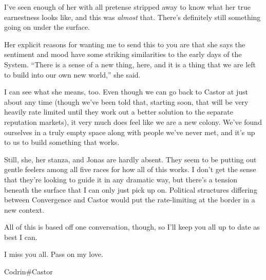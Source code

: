 I've seen enough of her with all pretense stripped away to know what her true earnestness looks like, and this was \emph{almost} that. There's definitely still something going on under the surface.

Her explicit reasons for wanting me to send this to you are that she says the sentiment and mood have some striking similarities to the early days of the System. ``There is a sense of a new thing, here, and it is a thing that we are left to build into our own new world,'' she said.

I can see what she means, too. Even though we can go back to Castor at just about any time (though we've been told that, starting soon, that will be very heavily rate limited until they work out a better solution to the separate reputation markets), it very much does feel like we are a new colony. We've found ourselves in a truly empty space along with people we've never met, and it's up to us to build something that works.

Still, she, her stanza, and Jonas are hardly absent. They seem to be putting out gentle feelers among all five races for how all of this works. I don't get the sense that they're looking to guide it in any dramatic way, but there's a tension beneath the surface that I can only just pick up on. Political structures differing between Convergence and Castor would put the rate-limiting at the border in a new context.

All of this is based off one conversation, though, so I'll keep you all up to date as best I can.

I miss you all. Pass on my love.

Codrin\#Castor
